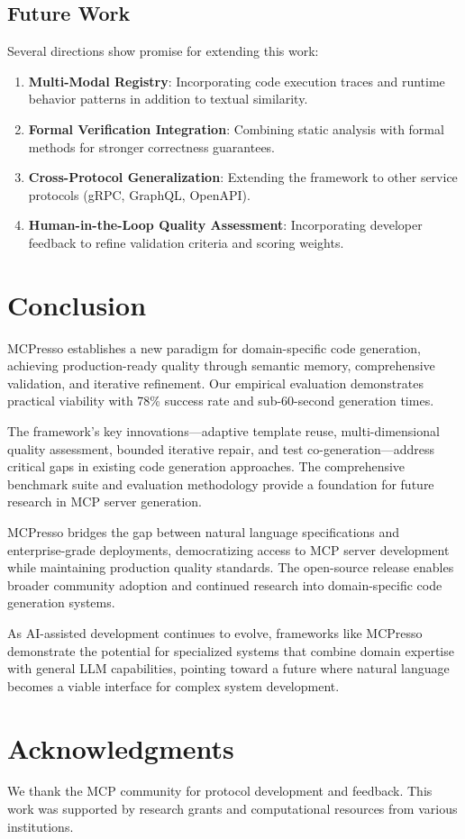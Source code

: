 \documentclass[10pt,twocolumn]{article}
\begin{document}
\subsection{Future Work}

Several directions show promise for extending this work:

\begin{enumerate}
\item \textbf{Multi-Modal Registry}: Incorporating code execution traces and runtime behavior patterns in addition to textual similarity.

\item \textbf{Formal Verification Integration}: Combining static analysis with formal methods for stronger correctness guarantees.

\item \textbf{Cross-Protocol Generalization}: Extending the framework to other service protocols (gRPC, GraphQL, OpenAPI).

\item \textbf{Human-in-the-Loop Quality Assessment}: Incorporating developer feedback to refine validation criteria and scoring weights.
\end{enumerate}

\section{Conclusion}

MCPresso establishes a new paradigm for domain-specific code generation, achieving production-ready quality through semantic memory, comprehensive validation, and iterative refinement. Our empirical evaluation demonstrates practical viability with 78\% success rate and sub-60-second generation times.

The framework's key innovations—adaptive template reuse, multi-dimensional quality assessment, bounded iterative repair, and test co-generation—address critical gaps in existing code generation approaches. The comprehensive benchmark suite and evaluation methodology provide a foundation for future research in MCP server generation.

MCPresso bridges the gap between natural language specifications and enterprise-grade deployments, democratizing access to MCP server development while maintaining production quality standards. The open-source release enables broader community adoption and continued research into domain-specific code generation systems.

As AI-assisted development continues to evolve, frameworks like MCPresso demonstrate the potential for specialized systems that combine domain expertise with general LLM capabilities, pointing toward a future where natural language becomes a viable interface for complex system development.

\section*{Acknowledgments}

We thank the MCP community for protocol development and feedback. This work was supported by research grants and computational resources from various institutions.



\end{document}
